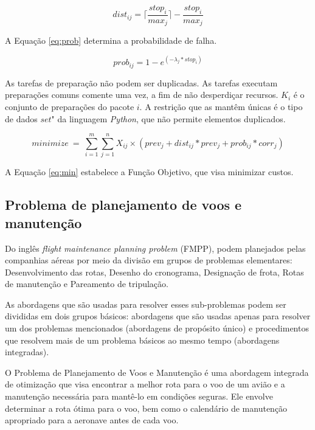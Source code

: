 \documentclass{article}
\begin{document}
\begin{equation}\label{eq:dist}
dist_{ij} = \lceil{\frac{stop_i}{max_j}}\rceil{}-\frac{stop_i}{max_j} 
\end{equation}


A Equação  \ref{eq:prob} determina a probabilidade de falha.

\begin{equation}\label{eq:prob}
prob_{ij} = 1 - e^{(-\lambda{}_j * stop_i)}
\end{equation}

As tarefas de preparação não podem ser duplicadas. As tarefas executam preparações comuns comente uma vez, a fim de não desperdiçar recursos.
$K_i$ é o conjunto de preparações do pacote $i$. A restrição que as mantêm únicas é o tipo de dados $set$" da linguagem {\it Python}, que não permite elementos duplicados.

\begin{equation} \label{eq:min}
minimize\ =\ \sum_{i=1}^{m} \sum_{j=1}^{n} X_{ij} \times ( prev_j + dist_{ij}*prev_j + prob_{ij}*corr_j )
\end{equation}

A Equação \ref{eq:min} estabelece a Função Objetivo, que visa minimizar custos.


\subsection{Problema de planejamento de voos e manutenção}

Do inglês {\it flight maintenance planning problem} (FMPP), podem planejados pelas companhias aéreas por meio da divisão em grupos de problemas elementares: Desenvolvimento das rotas, Desenho do cronograma, Designação de frota, Rotas de manutenção e Pareamento de tripulação. 

As abordagens que são usadas para resolver esses sub-problemas podem ser divididas em dois grupos básicos: abordagens que são usadas apenas para resolver um dos problemas mencionados (abordagens de propósito único) e procedimentos que resolvem mais de um problema básicos ao mesmo tempo (abordagens integradas).

O Problema de Planejamento de Voos e Manutenção é uma abordagem integrada de otimização que visa encontrar a melhor rota para o voo de um avião e a manutenção necessária para mantê-lo em condições seguras. Ele envolve determinar a rota ótima para o voo, bem como o calendário de manutenção apropriado para a aeronave antes de cada voo.
\end{document}
